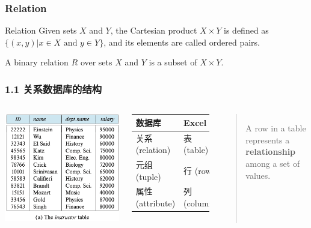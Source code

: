 \documentclass[aspectratio=169, 14pt]{beamer}
\begin{document}
\begin{frame}
    \frametitle{Relation}

\begin{exampleblock}{Relation}
    Given sets $X$ and $Y$, the Cartesian product $X \times Y$ is defined as $\{(x, y) | x \in X \text{ and } y \in Y\}$, and its elements are called ordered pairs.

    A \alert{binary relation} $R$ over sets $X$ and $Y$ is a subset of $X \times Y$.
\end{exampleblock}
    

\end{frame}
\begin{frame}
    \frametitle{1.1 关系数据库的结构}

    \begin{columns}
        \includegraphics[width=\textwidth]{table/instructor}
        \begin{table}
            \begin{tabular}{ll}
              \toprule
              数据库 & Excel \\
              \midrule
              \alert{关系} (relation) & 表 (table) \\
              \alert{元组} (tuple) & 行 (row) \\
              \alert{属性} (attribute) & 列 (column) \\
              \bottomrule
            \end{tabular}
        \end{table}
        \begin{quote}
            A row in a table represents a \textbf{relationship} among a set of values. 
        \end{quote}
    \end{columns}
\end{frame}
\end{document}
